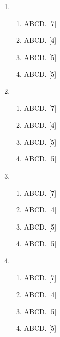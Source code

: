 \documentclass[a4paper,12pt]{article}
\begin{document}
\begin{enumerate}
\item \begin{enumerate}       
       \item ABCD. {\hfill [7]}
       \item ABCD. {\hfill [4]}
       \item ABCD. {\hfill [5]}
       \item ABCD. {\hfill [5]}
      \end{enumerate}
\item \begin{enumerate}       
       \item ABCD. {\hfill [7]}
       \item ABCD. {\hfill [4]}
       \item ABCD. {\hfill [5]}
       \item ABCD. {\hfill [5]}
      \end{enumerate}
      \item \begin{enumerate}       
       \item ABCD. {\hfill [7]}
       \item ABCD. {\hfill [4]}
       \item ABCD. {\hfill [5]}
       \item ABCD. {\hfill [5]}
      \end{enumerate}
\item \begin{enumerate}       
       \item ABCD. {\hfill [7]}
       \item ABCD. {\hfill [4]}
       \item ABCD. {\hfill [5]}
       \item ABCD. {\hfill [5]}
      \end{enumerate}
\end{enumerate}
\end{document}
